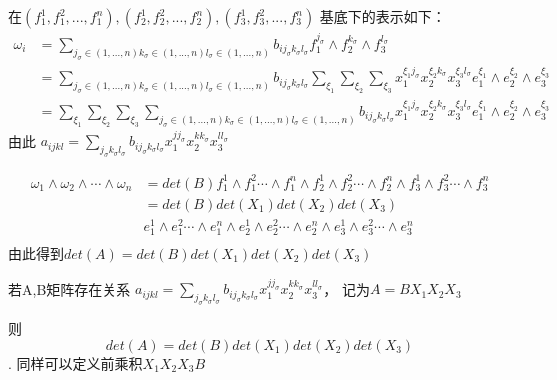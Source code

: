 \documentclass[twoside,a4paper,CCT]{cctart}   %
\begin{document}
在$(f_{1}^{1},f_{1}^{2},...,f_{1}^{n}),(f_{2}^{1},f_{2}^{2},...,f_{2}^{n}),(f_{3}^{1},f_{3}^{2},...,f_{3}^{n})$
基底下的表示如下：
\begin{equation}
\begin{aligned}
\omega_{i}
&= \sum_{j_{\sigma}\in {(1,...,n)}k_{\sigma}\in {(1,...,n)}l_{\sigma}\in{(1,...,n)}}b_{ij_{\sigma}k_{\sigma}l_{\sigma}} f_{1}^{j_{\sigma}} \wedge f_{2}^{k_{\sigma}} \wedge f_{3}^{l_{\sigma}} \\
&= \sum_{j_{\sigma}\in {(1,...,n)}k_{\sigma}\in {(1,...,n)}l_{\sigma}\in{(1,...,n)}}b_{ij_{\sigma}k_{\sigma}l_{\sigma}}
\sum_{\xi_{1}}\sum_{\xi_{2}}\sum_{\xi_{3}}x_{1}^{\xi_{1}j_{\sigma}}x_{2}^{\xi_{2}k_{\sigma}}x_{3}^{\xi_{3}l_{\sigma}}e_{1}^{\xi_{1}}\wedge e_{2}^{\xi_{2}}\wedge e_{3}^{\xi_{3}}\\
&= \sum_{\xi_{1}}\sum_{\xi_{2}}\sum_{\xi_{3}}\sum_{j_{\sigma}\in {(1,...,n)}k_{\sigma}\in {(1,...,n)}l_{\sigma}\in{(1,...,n)}}b_{ij_{\sigma}k_{\sigma}l_{\sigma}}
x_{1}^{\xi_{1}j_{\sigma}}x_{2}^{\xi_{2}k_{\sigma}}x_{3}^{\xi_{3}l_{\sigma}}e_{1}^{\xi_{1}}\wedge e_{2}^{\xi_{2}}\wedge e_{3}^{\xi_{3}}
\end{aligned}\end{equation}
由此
$a_{ijkl}=\sum_{j_{\sigma}k_{\sigma}l_{\sigma}}b_{ij_{\sigma}k_{\sigma}l_{\sigma}}x_{1}^{jj_{\sigma}}x_{2}^{kk_{\sigma}}x_{3}^{ll_{\sigma}}$

\begin{equation}
\begin{aligned}
\omega_{1}\wedge\omega_{2}\wedge\cdots\wedge\omega_{n}
& = det(B) f_{1}^1\wedge f_{1}^2 \cdots \wedge f_{1}^n \wedge f_{2}^1\wedge f_{2}^2 \cdots \wedge f_{2}^n
\wedge f_{3}^1\wedge f_{3}^2 \cdots \wedge f_{3}^n\\
& = det(B)det(X_{1})det(X_{2})det(X_{3}) \\
&e_{1}^1\wedge e_{1}^2 \cdots \wedge e_{1}^n \wedge e_{2}^1\wedge e_{2}^2 \cdots \wedge e_{2}^n
\wedge e_{3}^1\wedge e_{3}^2 \cdots \wedge e_{3}^n\\
\end{aligned}
\end{equation}
由此得到$det(A) = det(B)det(X_{1})det(X_{2})det(X_{3})$
\\

\begin{theorem}  若A,B矩阵存在关系
$a_{ijkl}=\sum_{j_{\sigma}k_{\sigma}l_{\sigma}}b_{ij_{\sigma}k_{\sigma}l_{\sigma}}x_{1}^{jj_{\sigma}}x_{2}^{kk_{\sigma}}x_{3}^{ll_{\sigma}}$，
记为$A=B{X_{1}X_{2}X_{3}}$
\end{theorem}
则$$det(A) = det(B)det(X_{1})det(X_{2})det(X_{3})$$.
同样可以定义前乘积$X_{1}X_{2}X_{3}{B}$
\end{document}
